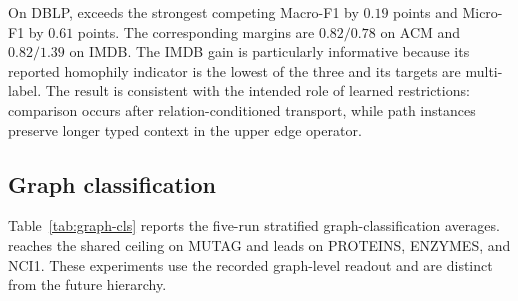 On DBLP, \method{} exceeds the strongest competing Macro-F1 by $0.19$ points and Micro-F1 by
$0.61$ points. The corresponding margins are $0.82/0.78$ on ACM and $0.82/1.39$ on IMDB. The IMDB
gain is particularly informative because its reported homophily indicator is the lowest of the
three and its targets are multi-label. The result is consistent with the intended role of learned
restrictions: comparison occurs after relation-conditioned transport, while path instances preserve
longer typed context in the upper edge operator.

\subsection{Graph classification}

Table~\ref{tab:graph-cls} reports the five-run stratified graph-classification averages. \method{} reaches the
shared ceiling on MUTAG and leads on PROTEINS, ENZYMES, and NCI1. These experiments use the recorded
graph-level readout and are distinct from the future \thspool{} hierarchy.

